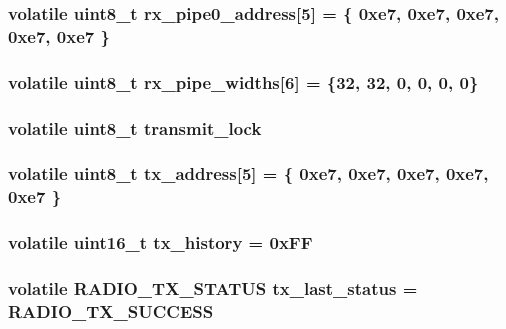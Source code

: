 \subsubsection{\setlength{\rightskip}{0pt plus 5cm}volatile uint8\_\-t {\bf rx\_\-pipe0\_\-address}[5] = \{ 0xe7, 0xe7, 0xe7, 0xe7, 0xe7 \}}\label{radio_8c_616999e7b15d8684a8979117cb85bbf2}


\subsubsection{\setlength{\rightskip}{0pt plus 5cm}volatile uint8\_\-t {\bf rx\_\-pipe\_\-widths}[6] = \{32, 32, 0, 0, 0, 0\}}\label{radio_8c_52892efa0238af933c098955c201a8dd}


\subsubsection{\setlength{\rightskip}{0pt plus 5cm}volatile uint8\_\-t {\bf transmit\_\-lock}}\label{radio_8c_50c9b8a9d8a0fb5fa538c8a5fd4e2b94}


\subsubsection{\setlength{\rightskip}{0pt plus 5cm}volatile uint8\_\-t {\bf tx\_\-address}[5] = \{ 0xe7, 0xe7, 0xe7, 0xe7, 0xe7 \}}\label{radio_8c_585f8101b2d4d49cebe1f8d392f408e0}


\subsubsection{\setlength{\rightskip}{0pt plus 5cm}volatile uint16\_\-t {\bf tx\_\-history} = 0x\-FF}\label{radio_8c_5ebf9ffa094e6db24c6e55a3a17e0bdb}


\subsubsection{\setlength{\rightskip}{0pt plus 5cm}volatile {\bf RADIO\_\-TX\_\-STATUS} {\bf tx\_\-last\_\-status} = RADIO\_\-TX\_\-SUCCESS}\label{radio_8c_1e370eaea58a5741d5bc1b7a243473c5}


